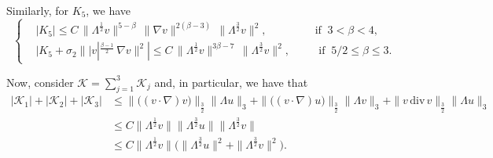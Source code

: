\documentclass[a4paper]{article}
\providecommand{\dv}{\,\mathrm{div}\,}
\begin{document}
Similarly, for $K_5$, we have
%
    \begin{equation*} \label{K_5.ii} \left\{
        \begin{aligned}
          & |K_5| \le C\,\|\Lambda^\frac12 v\|^{5-\beta}\, \|\nabla
          v\|^{2(\beta-3)}\, \|\Lambda^\frac32 v\|^2, \,\,\,\, &&\mbox{
            if } \ {3< \beta <4},
          \\
           & |K_5+\sigma_2 \||v|^\frac{\beta-1}{2}\, \nabla v\|^2| \le C\,
          \|\Lambda^\frac12 v\|^{3\beta -7}\,\|\Lambda^\frac32 v\|^2,
          \,\,\,\, && \mbox{ if } \ {5/2 \le \beta \le 3}.
        \end{aligned}
      \right.
    \end{equation*}

Now, consider $\mathcal{K}= \sum_{j=1}^3\mathcal{K}_j$ and, in particular, we have that
%
\begin{equation*}
  \begin{aligned}
    |\mathcal{K}_1| + |\mathcal{K}_2| +
    |\mathcal{K}_3|
    & \leq \|\big( (v\cdot \nabla) v\big)\|_{\frac{3}{2}}\|\Lambda u
    \|_3+ \|\big( (v\cdot \nabla) u\big)\|_{\frac{3}{2}} \|\Lambda v
    \|_3 + \| v\dv v \|_{\frac{3}{2}} \|\Lambda u \|_3
    \\
    & \leq C \|\Lambda^{\frac{1}{2}} v\| \|\Lambda^{\frac{3}{2}}
    u\|\|\Lambda^{\frac{3}{2}}v\|\\
    &\leq C \|\Lambda^{\frac{1}{2}} v\| \big( \|\Lambda^{\frac{3}{2}}
    u\|^2 +\|\Lambda^{\frac{3}{2}}v\|^2\big).
  \end{aligned}
\end{equation*}
\end{document}
